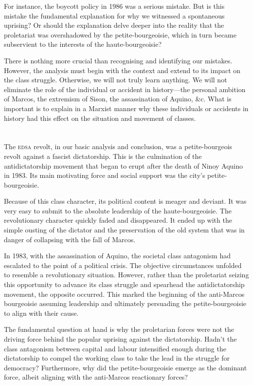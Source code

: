 \documentclass[a4paper,11pt,onesided]{report}
\begin{document}
For instance, the boycott policy in 1986 was a serious mistake.
But is this mistake the fundamental explanation 
for why we witnessed a spontaneous uprising?
Or should the explanation delve deeper 
into the reality that the proletariat was overshadowed 
by the petite-bourgeoisie, 
which in turn became subservient 
to the interests of the haute-bourgeoisie?

There is nothing more crucial 
than recognising and identifying our mistakes. 
However, the analysis must begin 
with the context and extend to its impact on the class struggle. 
Otherwise, we will not truly learn anything. 
We will not eliminate the role of the individual 
or accident in history---the 
personal ambition of Marcos, 
the extremism of Sison, 
the assassination of Aquino, \&c. 
What is important is to explain in a Marxist manner 
why these individuals or accidents in history 
had this effect on the situation and movement of classes.


\section{}
The \textsc{edsa} revolt, 
in our basic analysis and conclusion, 
was a petite-bourgeois revolt against a fascist dictatorship. 
This is the culmination of the antidictatorship movement 
that began to erupt after the death of Ninoy Aquino in 1983. 
Its main motivating force and social support was the city's petite-bourgeoisie.

Because of this class character, 
its political content is meager and deviant. 
It was very easy to submit to the absolute leadership of the haute-bourgeoisie. 
The revolutionary character quickly faded and disappeared. 
It ended up with the simple ousting of the dictator 
and the preservation of the old system that was in danger of collapsing 
with the fall of Marcos.

In 1983, with the assassination of Aquino, 
the societal class antagonism had escalated 
to the point of a political crisis. 
The objective circumstances unfolded 
to resemble a revolutionary situation. 
However, rather than the proletariat seizing this opportunity 
to advance its class struggle 
and spearhead the antidictatorship movement, 
the opposite occurred. 
This marked the beginning of the anti-Marcos bourgeoisie 
assuming leadership and ultimately persuading 
the petite-bourgeoisie to align with their cause.

The fundamental question at hand 
is why the proletarian forces 
were not the driving force 
behind the popular uprising against the dictatorship. 
Hadn't the class antagonism between capital and labour 
intensified enough during the dictatorship 
to compel the working class 
to take the lead in the struggle for democracy? 
Furthermore, 
why did the petite-bourgeoisie emerge as the dominant force, 
albeit aligning with the anti-Marcos reactionary forces?
\end{document}
